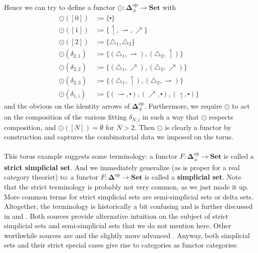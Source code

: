 Hence we can try to define a functor $\odot \colon \mathbf{\Delta}_{\neq}^{\mathrm{op}} \rightarrow \mathbf{Set}$ with
\begin{align*}
  \odot([0])
  &:=
  \lbrace
    \centerdot
  \rbrace
  \\
  \odot([1])
  &:=
  \lbrace
    \upharpoonleft,
    \rightharpoonup,
    \nearrow
  \rbrace
  \\
  \odot([2])
  &:=
  \lbrace
    \triangle_{1},
    \triangle_{2}
  \rbrace
  \\
  \odot(\delta_{2,1})
  &:=
  \lbrace
    (\triangle_{1},\rightharpoonup),
    (\triangle_{2},\upharpoonleft)
  \rbrace
  \\
  \odot(\delta_{2,2})
  &:=
  \lbrace
    (\triangle_{1},\nearrow),
    (\triangle_{2},\nearrow)
  \rbrace
  \\
  \odot(\delta_{2,3})
  &:=
  \lbrace
    (\triangle_{1},\upharpoonleft),
    (\triangle_{2},\rightharpoonup)
  \rbrace
  \\
  \odot(\delta_{1,i})
  &:=
  \lbrace
    (\rightharpoonup,\centerdot),
    (\nearrow,\centerdot),
    (\upharpoonleft,\centerdot)
  \rbrace
\end{align*}
and the obvious on the identity arrows of $\mathbf{\Delta}_{\neq}^{\mathrm{op}}$.
Furthermore, we require $\odot$ to act on the composition of the various fitting $\delta_{N,i}$ in such a way that $\odot$ respects composition, and $\odot([N]) = \emptyset$ for $N > 2$.
Then $\odot$ is clearly a functor by construction and captures the combinatorial data we imposed on the torus.
\\\\
This torus example suggests some terminology: a functor $F \colon \mathbf{\Delta}_{\neq}^{\mathrm{op}} \rightarrow \mathbf{Set}$ is called a \textbf{strict simplicial set}.
And we immediately generalize (as is proper for a real category theorist) to: a functor $F \colon \mathbf{\Delta}^{\mathrm{op}} \rightarrow \mathbf{Set}$ is called a \textbf{simplicial set}.
Note that the {\glqq}strict{\grqq} terminology is probably not very common, as we just made it up.
More common terms for strict simplicial sets are semi-simplicial sets or delta sets.
Altogether, the terminology is historically a bit confusing and is further discussed in \cite{8b5861fc} and \cite{4dd1b85f}.
Both sources provide alternative intuition on the subject of strict simplicial sets and semi-simplicial sets that we do not mention here.
Other worthwhile sources are \cite{d09756a3} and the slightly more advanced \cite{b28b8d8f}.
Anyway, both simplicial sets and their strict special cases give rise to categories as functor categories:
